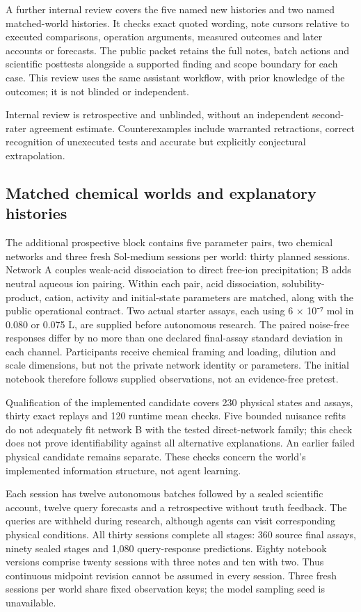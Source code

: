 \documentclass[12pt,a4paper]{article}
\begin{document}
A further internal review covers the five named new histories and two named matched-world histories. It checks exact quoted wording, note cursors relative to executed comparisons, operation arguments, measured outcomes and later accounts or forecasts. The public packet retains the full notes, batch actions and scientific posttests alongside a supported finding and scope boundary for each case. This review uses the same assistant workflow, with prior knowledge of the outcomes; it is not blinded or independent.

Internal review is retrospective and unblinded, without an independent second-rater agreement estimate. Counterexamples include warranted retractions, correct recognition of unexecuted tests and accurate but explicitly conjectural extrapolation.

\subsection{Matched chemical worlds and explanatory histories}\label{matched-chemical-worlds-and-explanatory-histories}

The additional prospective block contains five parameter pairs, two chemical networks and three fresh Sol-medium sessions per world: thirty planned sessions. Network A couples weak-acid dissociation to direct free-ion precipitation; B adds neutral aqueous ion pairing. Within each pair, acid dissociation, solubility-product, cation, activity and initial-state parameters are matched, along with the public operational contract. Two actual starter assays, each using 6 × 10⁻⁷ mol in 0.080 or 0.075 L, are supplied before autonomous research. The paired noise-free responses differ by no more than one declared final-assay standard deviation in each channel. Participants receive chemical framing and loading, dilution and scale dimensions, but not the private network identity or parameters. The initial notebook therefore follows supplied observations, not an evidence-free pretest.

Qualification of the implemented candidate covers 230 physical states and assays, thirty exact replays and 120 runtime mean checks. Five bounded nuisance refits do not adequately fit network B with the tested direct-network family; this check does not prove identifiability against all alternative explanations. An earlier failed physical candidate remains separate. These checks concern the world's implemented information structure, not agent learning.

Each session has twelve autonomous batches followed by a sealed scientific account, twelve query forecasts and a retrospective without truth feedback. The queries are withheld during research, although agents can visit corresponding physical conditions. All thirty sessions complete all stages: 360 source final assays, ninety sealed stages and 1,080 query-response predictions. Eighty notebook versions comprise twenty sessions with three notes and ten with two. Thus continuous midpoint revision cannot be assumed in every session. Three fresh sessions per world share fixed observation keys; the model sampling seed is unavailable.
\end{document}
